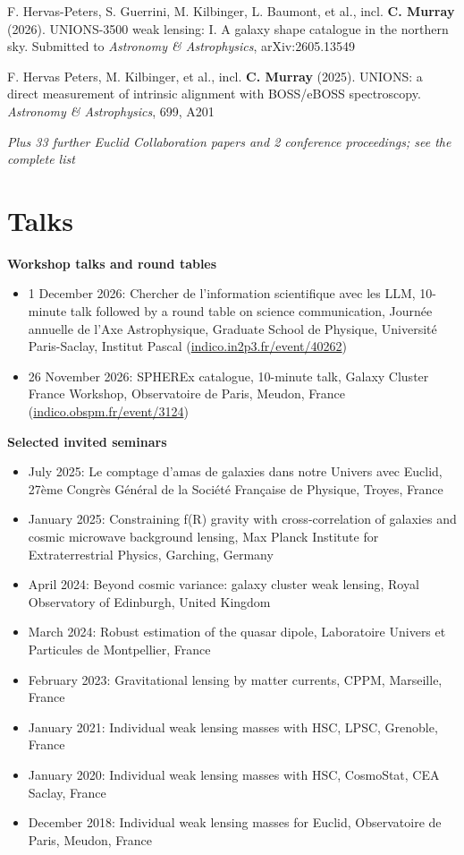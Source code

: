 \documentclass[11pt]{article}
\begin{document}
F. Hervas-Peters, S. Guerrini, M. Kilbinger, L. Baumont, et al., incl. \textbf{C. Murray} (2026). UNIONS-3500 weak lensing: I. A galaxy shape catalogue in the northern sky. Submitted to \textit{Astronomy \& Astrophysics}, arXiv:2605.13549

F. Hervas Peters, M. Kilbinger, et al., incl. \textbf{C. Murray} (2025). UNIONS: a direct measurement of intrinsic alignment with BOSS/eBOSS spectroscopy. \textit{Astronomy \& Astrophysics}, 699, A201

\textit{Plus 33 further Euclid Collaboration papers and 2 conference proceedings; see the complete list}

\section*{Talks}

\textbf{Workshop talks and round tables}
\begin{itemize}[leftmargin=1.5em, itemsep=0.2em]
\item 1 December 2026: Chercher de l'information scientifique avec les LLM, 10-minute talk followed by a round table on science communication, Journée annuelle de l'Axe Astrophysique, Graduate School de Physique, Université Paris-Saclay, Institut Pascal (\href{https://indico.in2p3.fr/event/40262/}{indico.in2p3.fr/event/40262})
\item 26 November 2026: SPHEREx catalogue, 10-minute talk, Galaxy Cluster France Workshop, Observatoire de Paris, Meudon, France (\href{https://indico.obspm.fr/event/3124/}{indico.obspm.fr/event/3124})
\end{itemize}

\textbf{Selected invited seminars}
\begin{itemize}[leftmargin=1.5em, itemsep=0.2em]
\item July 2025: Le comptage d'amas de galaxies dans notre Univers avec Euclid, 27ème Congrès Général de la Société Française de Physique, Troyes, France
\item January 2025: Constraining f(R) gravity with cross-correlation of galaxies and cosmic microwave background lensing, Max Planck Institute for Extraterrestrial Physics, Garching, Germany
\item April 2024: Beyond cosmic variance: galaxy cluster weak lensing, Royal Observatory of Edinburgh, United Kingdom
\item March 2024: Robust estimation of the quasar dipole, Laboratoire Univers et Particules de Montpellier, France
\item February 2023: Gravitational lensing by matter currents, CPPM, Marseille, France
\item January 2021: Individual weak lensing masses with HSC, LPSC, Grenoble, France
\item January 2020: Individual weak lensing masses with HSC, CosmoStat, CEA Saclay, France
\item December 2018: Individual weak lensing masses for Euclid, Observatoire de Paris, Meudon, France
\end{itemize}
\end{document}
